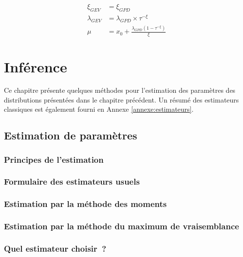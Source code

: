 \documentclass[
]{book}
\begin{document}
\begin{align}
\xi_{GEV} &= \xi_{GPD} \\
\lambda_{GEV} &= \lambda_{GPD} \times \tau^{-\xi}\\
\mu &= x_0 + \frac{\lambda_{GPD}(1-\tau^{-\xi})}{\xi}
\label{eq:GEVGPD}
\end{align}

\chapter{Inférence}\label{infuxe9rence}

Ce chapitre présente quelques méthodes pour l'estimation des paramètres des distributions présentées dans le chapitre précédent. Un résumé des estimateurs classiques est également fourni en Annexe \ref{annexe:estimateurs}.

\section{Estimation de paramètres}\label{estimation-de-paramuxe8tres}

\subsection{Principes de l'estimation}\label{principes-de-lestimation}

\subsection{Formulaire des estimateurs usuels}\label{formulaire-des-estimateurs-usuels}

\subsection{Estimation par la méthode des moments}\label{estimation-par-la-muxe9thode-des-moments}

\subsection{Estimation par la méthode du maximum de vraisemblance}\label{estimation-par-la-muxe9thode-du-maximum-de-vraisemblance}

\subsection{Quel estimateur choisir~?}\label{quel-estimateur-choisir}
\end{document}
